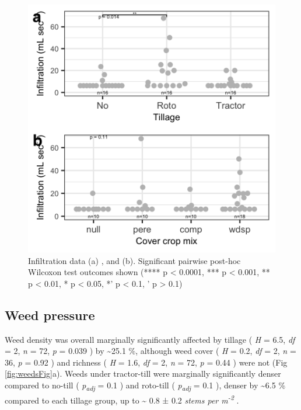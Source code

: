 \documentclass[
  12pt,
]{article}
\begin{document}
\begin{figure}
\includegraphics[width=12.5in]{../figs/infilPlot} \caption{Infiltration data (a) , and (b). Significant pairwise post-hoc Wilcoxon test outcomes shown (**** p < 0.0001, *** p < 0.001, ** p < 0.01, * p < 0.05, *' p < 0.1, ' p > 0.1)}\label{fig:infilFig}
\end{figure}

\hypertarget{weed-pressure}{%
\subsection{Weed pressure}\label{weed-pressure}}

Weed density was overall marginally significantly affected by tillage (
\emph{H} = 6.5,
\emph{df} = 2,
\emph{n} = 72,
\emph{p} = 0.039
) by
\textasciitilde25.1 \%,
although weed cover (
\emph{H} = 0.2,
\emph{df} = 2,
\emph{n} = 36,
\emph{p} = 0.92
) and richness (
\emph{H} = 1.6,
\emph{df} = 2,
\emph{n} = 72,
\emph{p} = 0.44
) were not
(Fig \ref{fig:weedsFig}a).
Weeds under tractor-till were marginally significantly denser compared to no-till (
\emph{p\textsubscript{adj}} = 0.1
) and roto-till (
\emph{p\textsubscript{adj}} = 0.1
), denser by
\textasciitilde6.5 \%
compared to each tillage group,
up to
\textasciitilde{} 0.8 ±
0.2 \emph{stems per m\textsuperscript{-2}}
.
\end{document}
